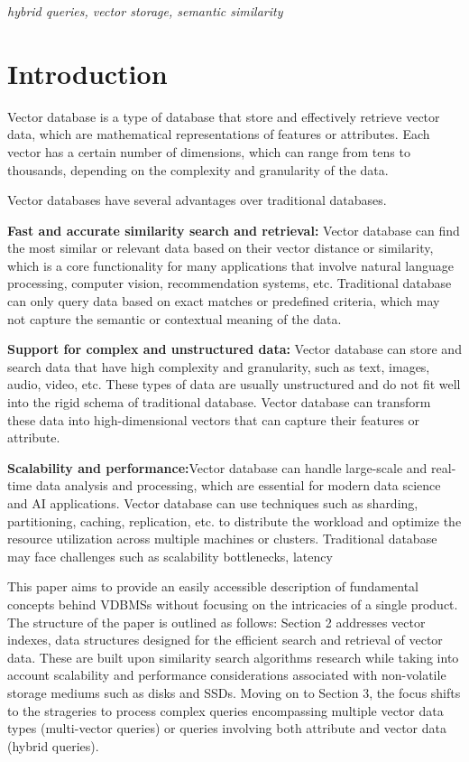 \documentclass[conference]{IEEEtran}
\begin{document}
\begin{IEEEkeywords}
\textit{ \normalfont hybrid queries, vector storage, semantic similarity}
\end{IEEEkeywords}

\section{Introduction}
Vector database is a type of database that store and effectively retrieve vector data, which are mathematical representations of features or attributes. Each vector has a certain number of dimensions, which can range from tens to thousands, depending on the complexity and granularity of the data.

Vector databases have several advantages over traditional databases.

\textbf{Fast and accurate similarity search and retrieval:} Vector
database can find the most similar or relevant data based on
their vector distance or similarity, which is a core functionality
for many applications that involve natural language processing,
computer vision, recommendation systems, etc. Traditional
database can only query data based on exact matches or
predefined criteria, which may not capture the semantic or
contextual meaning of the data.

\textbf{Support for complex and unstructured data:} Vector
database can store and search data that have high complexity
and granularity, such as text, images, audio, video, etc. These
types of data are usually unstructured and do not fit well into
the rigid schema of traditional database. Vector database can
transform these data into high-dimensional vectors that can
capture their features or attribute.

\textbf{Scalability and performance:}Vector database can handle
large-scale and real-time data analysis and processing, which
are essential for modern data science and AI applications.
Vector database can use techniques such as sharding, partitioning, caching, replication, etc. to distribute the workload
and optimize the resource utilization across multiple machines
or clusters. Traditional database may face challenges such as
scalability bottlenecks, latency


This paper aims to provide an easily accessible description of fundamental concepts behind VDBMSs  without focusing on the intricacies of a single product. The structure of the paper is outlined as follows: Section 2 addresses vector indexes, data structures designed for the efficient search and retrieval of vector data. These are built upon similarity search algorithms research while taking into account scalability and performance considerations associated with non-volatile storage mediums such as disks and SSDs. Moving on to Section 3, the focus shifts to the strageries to process complex queries encompassing multiple vector data types (multi-vector queries) or queries involving both attribute and vector data (hybrid queries).
\end{document}
